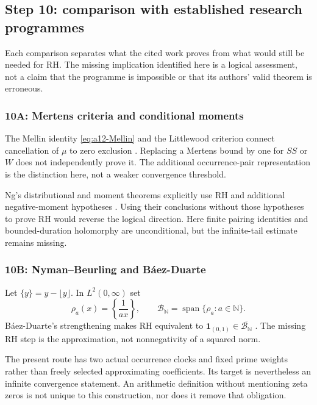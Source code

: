 \documentclass[11pt]{amsart}
\numberwithin{equation}{section}
\theoremstyle{plain}
\theoremstyle{definition}
\theoremstyle{remark}
\begin{document}
\subsection{Step 10: comparison with established research programmes}
\label{subsec:a12-literature}
Each comparison separates what the cited work proves from what would
still be needed for RH. The missing implication identified here is a
logical assessment, not a claim that the programme is impossible or
that its authors' valid theorem is erroneous.

\subsubsection{10A: Mertens criteria and conditional moments}
\label{subsubsec:a12-lit-Mertens}
The Mellin identity \eqref{eq:a12-Mellin} and the Littlewood criterion
connect cancellation of $\mu$ to zero exclusion
\cite{Littlewood1912,Titchmarsh1986}.
Replacing a Mertens bound by one for $SS$ or $W$ does not independently
prove it. The additional occurrence-pair representation is the distinction
here, not a weaker convergence threshold.

Ng's distributional and moment theorems explicitly use RH and additional
negative-moment hypotheses \cite{Ng2004}. Using their conclusions without
those hypotheses to prove RH would reverse the logical direction.
Here finite pairing identities and bounded-duration holomorphy are
unconditional, but the infinite-tail estimate remains missing.

\subsubsection{10B: Nyman--Beurling and B\'aez-Duarte}
\label{subsubsec:a12-lit-NB}
Let $\{y\}=y-\lfloor y\rfloor$. In $L^2(0,\infty)$ set
\begin{equation}
\label{eq:a12-NB}
\rho_a(x)=\left\{\frac1{ax}\right\},\qquad
\mathcal B_{\mathbb N}=\operatorname{span}\{\rho_a:a\in\mathbb N\}.
\end{equation}
B\'aez-Duarte's strengthening makes RH equivalent to
$\mathbf1_{(0,1)}\in\overline{\mathcal B_{\mathbb N}}$
\cite{BaezDuarte2002}. The missing RH step is the approximation, not
nonnegativity of a squared norm.

The present route has two actual occurrence clocks and fixed prime
weights rather than freely selected approximating coefficients.
Its target is nevertheless an infinite convergence statement.
An arithmetic definition without mentioning zeta zeros is not unique
to this construction, nor does it remove that obligation.
\end{document}
